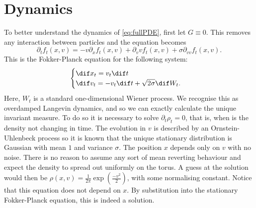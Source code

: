 \documentclass[11pt, a4paper, draft]{article}
\begin{document}
		\section{Dynamics}\label{sec:dynamics}
		To better understand the dynamics of \eqref{eq:fullPDE}, first let $G\equiv0$. This removes any interaction between particles and the equation becomes
		\begin{equation}\label{eq:OU_FPE}
			\partial_t f_t(x,v) = -v\partial_x f_t(x,v) +\partial_v vf_t(x,v) + \sigma \partial_{vv}f_t(x,v).
		\end{equation}
		This is the Fokker-Planck equation for the following system:
		\begin{equation}\label{eq:2d_OU}\begin{cases}
			\dif x_t = v_t\dif t\\
			\dif v_t = -v_t\dif t + \sqrt{2\sigma} \dif W_t. 
		\end{cases}	\end{equation}
		Here, $W_t$ is a standard one-dimensional Wiener process. We recognise this as overdamped Langevin dynamics, and so we can exactly calculate the unique invariant measure. To do so it is necessary to solve $\partial_t \rho_t = 0$, that is, when is the density not changing in time. The evolution in $v$ is described by an Ornstein-Uhlenbeck process so it is known that the unique stationary distribution is Gaussian with mean $1$ and variance $\sigma$. The position $x$ depends only on $v$ with no noise. There is no reason to assume any sort of mean reverting behaviour and expect the density to spread out uniformly on the torus. A guess at the solution would then be $\rho (x,v) = \frac{1}{2\pi}\exp(\frac{-v^2}{2})$, with some normalising constant. Notice that this equation does not depend on $x$. By substitution into the stationary Fokker-Planck equation, this is indeed a solution.
        
\end{document}
